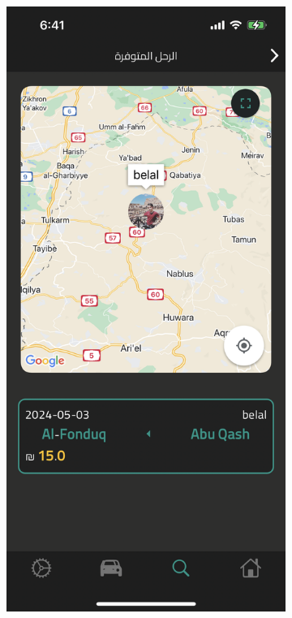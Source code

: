 \documentclass[a4paper, 12pt]{report} %
\begin{document}
\begin{figure}[H]
                \begin{subfigure}{0.31\textwidth}
                    \includegraphics[width=\linewidth]{Images/trip_search_3.png}

\end{subfigure}
\end{figure}
\end{document}
